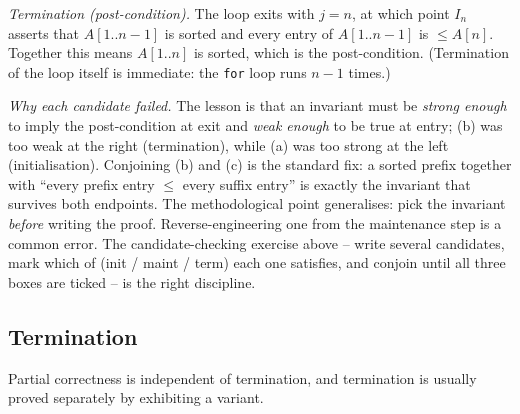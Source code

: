 \begin{example}
\medskip
\noindent\textit{Termination (post-condition).} The loop exits with $j = n$, at which point $I_n$ asserts that $A[1..n-1]$ is sorted and every entry of $A[1..n-1]$ is $\le A[n]$. Together this means $A[1..n]$ is sorted, which is the post-condition. (Termination of the loop itself is immediate: the \texttt{for} loop runs $n - 1$ times.)

\medskip
\noindent\textit{Why each candidate failed.} The lesson is that an invariant must be \emph{strong enough} to imply the post-condition at exit and \emph{weak enough} to be true at entry; (b) was too weak at the right (termination), while (a) was too strong at the left (initialisation). Conjoining (b) and (c) is the standard fix: a sorted prefix together with ``every prefix entry $\le$ every suffix entry'' is exactly the invariant that survives both endpoints. The methodological point generalises: pick the invariant \emph{before} writing the proof. Reverse-engineering one from the maintenance step is a common error. The candidate-checking exercise above -- write several candidates, mark which of (init / maint / term) each one satisfies, and conjoin until all three boxes are ticked -- is the right discipline.
\end{example}

\subsection{Termination}

Partial correctness is independent of termination, and termination is usually proved separately by exhibiting a variant.

